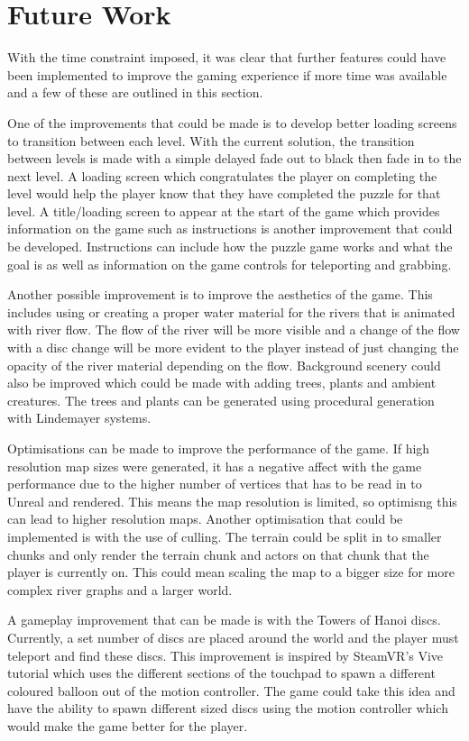 \section{Future Work}
With the time constraint imposed, it was clear that further features could have been implemented to improve the gaming experience if more time was available and a few of these are outlined in this section.
\newline
\par
One of the improvements that could be made is to develop better loading screens to transition between each level. With the current solution, the transition between levels is made with a simple delayed fade out to black then fade in to the next level. A loading screen which congratulates the player on completing the level would help the player know that they have completed the puzzle for that level. A title/loading screen to appear at the start of the game which provides information on the game such as instructions is another improvement that could be developed. Instructions can include how the puzzle game works and what the goal is as well as information on the game controls for teleporting and grabbing.
\newline
\par
Another possible improvement is to improve the aesthetics of the game. This includes using or creating a proper water material for the rivers that is animated with river flow. The flow of the river will be more visible and a change of the flow with a disc change will be more evident to the player instead of just changing the opacity of the river material depending on the flow. Background scenery could also be improved which could be made with adding trees, plants and ambient creatures. The trees and plants can be generated using procedural generation with Lindemayer systems.
\newline
\par
Optimisations can be made to improve the performance of the game. If high resolution map sizes were generated, it has a negative affect with the game performance due to the higher number of vertices that has to be read in to Unreal and rendered. This means the map resolution is limited, so optimisng this can lead to higher resolution maps. Another optimisation that could be implemented is with the use of culling. The terrain could be split in to smaller chunks and only render the terrain chunk and actors on that chunk that the player is currently on. This could mean scaling the map to a bigger size for more complex river graphs and a larger world.
\newline
\par
A gameplay improvement that can be made is with the Towers of Hanoi discs. Currently, a set number of discs are placed around the world and the player must teleport and find these discs. This improvement is inspired by SteamVR's Vive tutorial which uses the different sections of the touchpad to spawn a different coloured balloon out of the motion controller. The game could take this idea and have the ability to spawn different sized discs using the motion controller which would make the game better for the player.

